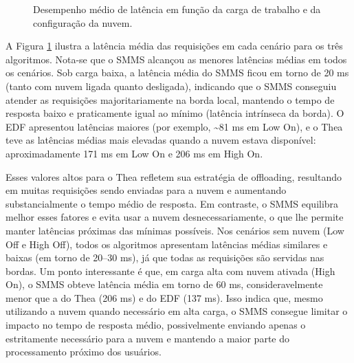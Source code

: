 \begin{figure}[ht!]
    \caption{Desempenho médio de latência em função da carga de trabalho e da configuração da nuvem.}
    \label{fig:results2}
\end{figure}

A Figura \ref{fig:results2} ilustra a latência média das requisições em cada cenário para os três algoritmos. Nota-se que o SMMS alcançou as menores latências médias em todos os cenários. Sob carga baixa, a latência média do SMMS ficou em torno de 20 ms (tanto com nuvem ligada quanto desligada), indicando que o SMMS conseguiu atender as requisições majoritariamente na borda local, mantendo o tempo de resposta baixo e praticamente igual ao mínimo (latência intrínseca da borda). O EDF apresentou latências maiores (por exemplo, \textasciitilde81 ms em Low On), e o Thea teve as latências médias mais elevadas quando a nuvem estava disponível: aproximadamente 171 ms em Low On e 206 ms em High On.

Esses valores altos para o Thea refletem sua estratégia de offloading, resultando em muitas requisições sendo enviadas para a nuvem e aumentando substancialmente o tempo médio de resposta. Em contraste, o SMMS equilibra melhor esses fatores e evita usar a nuvem desnecessariamente, o que lhe permite manter latências próximas das mínimas possíveis. Nos cenários sem nuvem (Low Off e High Off), todos os algoritmos apresentam latências médias similares e baixas (em torno de 20–30 ms), já que todas as requisições são servidas nas bordas. Um ponto interessante é que, em carga alta com nuvem ativada (High On), o SMMS obteve latência média em torno de 60 ms, consideravelmente menor que a do Thea (206 ms) e do EDF (137 ms). Isso indica que, mesmo utilizando a nuvem quando necessário em alta carga, o SMMS consegue limitar o impacto no tempo de resposta médio, possivelmente enviando apenas o estritamente necessário para a nuvem e mantendo a maior parte do processamento próximo dos usuários.

